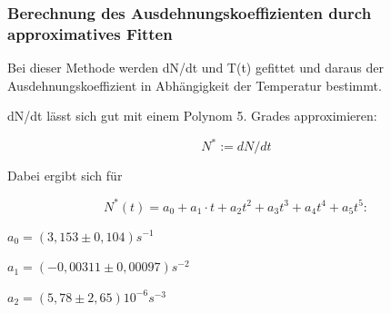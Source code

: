 \subsubsection{Berechnung des Ausdehnungskoeffizienten durch approximatives Fitten}

Bei dieser Methode werden dN/dt und T(t) gefittet und daraus der Ausdehnungskoeffizient in Abhängigkeit der Temperatur bestimmt.

dN/dt lässt sich gut mit einem Polynom 5. Grades approximieren:

\begin{equation}
 N^{*} := dN/dt 
\end{equation}

Dabei ergibt sich für 


\begin{equation}
N^{*}(t)=a_{0}+a_{1} \cdot t+a_{2}t^{2}+a_{3}t^{3}+a_{4}t^{4}+a_{5}t^{5} :
\end{equation}

$
 a_{0} =(3,153 \pm 0,104) s^{-1} 
$

$
a_{1}=(-0,00311 \pm 0,00097)s^{-2}
$

$
a_{2}=(5,78 \pm 2,65)10^{-6}s^{-3}
$

